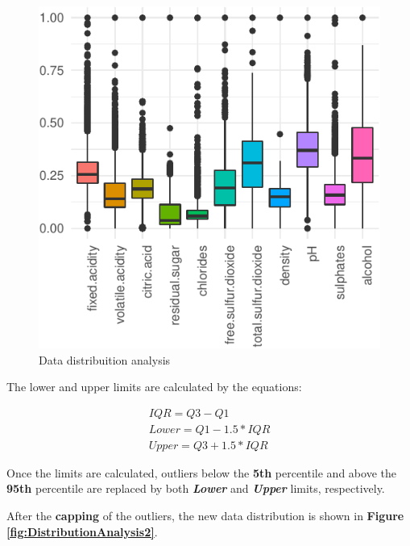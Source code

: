 \documentclass[a4paperpaper,9pt,twocolumn,twoside,printwatermark=false]{pinp}
\begin{document}
\begin{figure}

{\centering \includegraphics{WineQualityAnalysis_files/figure-latex/DistribuitionAnalysis-1} 

}

\caption{Data distribuition analysis}\label{fig:DistribuitionAnalysis}
\end{figure}

The lower and upper limits are calculated by the equations:

\begin{gather}
IQR = Q3 - Q1 \\ 
Lower = Q1 - 1.5 * IQR \\ 
Upper = Q3 + 1.5 * IQR
\end{gather}

Once the limits are calculated, outliers below the \textbf{5th}
percentile and above the \textbf{95th} percentile are replaced by both
\textbf{\emph{Lower}} and \textbf{\emph{Upper}} limits, respectively.

After the \textbf{capping} of the outliers, the new data distribution is
shown in \textbf{Figure \ref{fig:DistributionAnalysis2}}.
\end{document}
